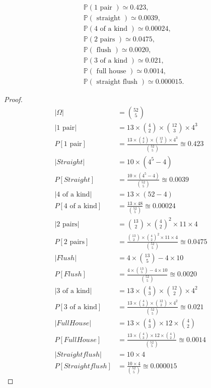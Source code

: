 \documentclass[letterpaper, 11pt]{article}
\newcommand{\1}{\mathds{1}}	%
\theoremstyle{definition}
\begin{document}
$$\begin{aligned}
& \mathbb{P}(1 \text { pair }) \simeq 0.423, \\
& \mathbb{P}(\text { straight }) \simeq 0.0039, \\
& \mathbb{P}(4 \text { of a kind }) \simeq 0.00024, \\
& \mathbb{P}(2 \text { pairs }) \simeq 0.0475, \\
& \mathbb{P}(\text { flush }) \simeq 0.0020, \\
& \mathbb{P}(3 \text { of a kind }) \simeq 0.021, \\
& \mathbb{P}(\text { full house }) \simeq 0.0014, \\
& \mathbb{P}(\text { straight flush }) \simeq 0.000015 .
\end{aligned}$$
\begin{proof}
    \begin{align*}{}{}
        |\Omega|&=\binom{52}{5}  \\
        |1\text{ pair}|&=13\times\binom{4}{2}\times\binom{12}{3}\times4^3  \\
        P[1\text{ pair}]&=\frac{13\times\binom{4}{2}\times\binom{12}{3}\times4^3}{\binom{52}{5}}\approxeq 0.423\\[1ex]
           |Straight|&=10\times(4^5-4)  \\
           P[Straight]&=\frac{10\times(4^5-4)}{\binom{52}{5}}\approxeq 0.0039\\[1ex]
           |4\text{ of a kind}|&=13\times(52-4)  \\
              P[4\text{ of a kind}]&=\frac{13\times48}{\binom{52}{5}}\approxeq 0.00024\\[1ex]
              |2\text{ pairs}|&=\binom{13}{2}\times\binom{4}{2}^2\times11\times4  \\
              P[2\text{ pairs}]&=\frac{\binom{13}{2}\times\binom{4}{2}^2\times11\times4}{\binom{52}{5}}\approxeq 0.0475\\[1ex]
                |Flush|&=4\times\binom{13}{5} -4\times10 \\
                P[Flush]&=\frac{4\times\binom{13}{5} -4\times10}{\binom{52}{5}}\approxeq 0.0020\\[1ex]
              |3\text{ of a kind}|&=13\times\binom{4}{3}\times\binom{12}{2}\times4^2  \\
                P[3\text{ of a kind}]&=\frac{13\times\binom{4}{3}\times\binom{12}{2}\times4^2}{\binom{52}{5}}\approxeq 0.021\\[1ex]
           |Full House|&=13\times\binom{4}{3}\times12\times\binom{4}{2}  \\
           P[Full House]&=\frac{13\times\binom{4}{3}\times12\times\binom{4}{2}}{\binom{52}{5}}\approxeq 0.0014\\[1ex]
           |Straight flush|&=10\times 4\\
           P[Straight flush]&=\frac{10\times 4}{\binom{52}{5}}\approxeq 0.000015
        \end{align*} 
\end{proof}
\end{document}
